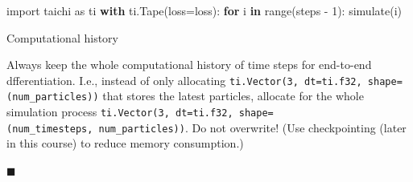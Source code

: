 \documentclass[11pt]{article}
\newenvironment{Shaded}{}{}
\newcommand{\KeywordTok}[1]{\textcolor[rgb]{0.00,0.44,0.13}{\textbf{{#1}}}}
\newcommand{\DecValTok}[1]{\textcolor[rgb]{0.25,0.63,0.44}{{#1}}}
\newcommand{\NormalTok}[1]{{#1}}
\newcommand{\ImportTok}[1]{{#1}}
\newcommand{\ControlFlowTok}[1]{\textcolor[rgb]{0.00,0.44,0.13}{\textbf{{#1}}}}
\newcommand{\OperatorTok}[1]{\textcolor[rgb]{0.40,0.40,0.40}{{#1}}}
\newcommand{\BuiltInTok}[1]{{#1}}
\begin{document}
\begin{Shaded}
\begin{Highlighting}[]
\ImportTok{import}\NormalTok{ taichi }\ImportTok{as}\NormalTok{ ti}
\ControlFlowTok{with}\NormalTok{ ti.Tape(loss}\OperatorTok{=}\NormalTok{loss):}
    \ControlFlowTok{for}\NormalTok{ i }\KeywordTok{in} \BuiltInTok{range}\NormalTok{(steps }\OperatorTok{{-}} \DecValTok{1}\NormalTok{):}
\NormalTok{        simulate(i)}
\end{Highlighting}
\end{Shaded}

Computational history

Always keep the whole computational history of time steps for end-to-end
dfferentiation. I.e., instead of only allocating
\texttt{ti.Vector(3,\ dt=ti.f32,\ shape=(num\_particles))} that stores
the latest particles, allocate for the whole simulation process
\texttt{ti.Vector(3,\ dt=ti.f32,\ shape=(num\_timesteps,\ num\_particles))}.
Do not overwrite! (Use checkpointing (later in this course) to reduce
memory consumption.)

    \(\blacksquare\)


    
    
    
\end{document}
